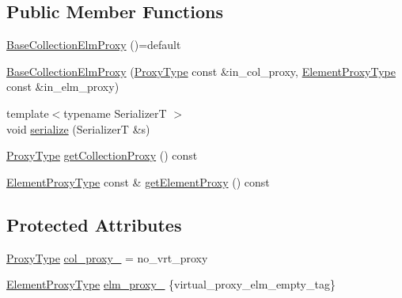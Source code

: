 \subsection*{Public Member Functions}
\begin{DoxyCompactItemize}
\item 
\hyperlink{structvt_1_1vrt_1_1collection_1_1_base_collection_elm_proxy_a2d69acf294b3c84033654a280a2b03d9}{Base\+Collection\+Elm\+Proxy} ()=default
\item 
\hyperlink{structvt_1_1vrt_1_1collection_1_1_base_collection_elm_proxy_a3b6fc7db3f5e10838e11615570ec067f}{Base\+Collection\+Elm\+Proxy} (\hyperlink{structvt_1_1vrt_1_1collection_1_1_base_collection_elm_proxy_af80f1576659b626a30828c6d85eca926}{Proxy\+Type} const \&in\+\_\+col\+\_\+proxy, \hyperlink{structvt_1_1vrt_1_1collection_1_1_base_collection_elm_proxy_a0f37a49c04c28fdc6ea8665aefc2f40c}{Element\+Proxy\+Type} const \&in\+\_\+elm\+\_\+proxy)
\item 
{\footnotesize template$<$typename SerializerT $>$ }\\void \hyperlink{structvt_1_1vrt_1_1collection_1_1_base_collection_elm_proxy_ac49c4e9d158a3d3c874f1dcfb5a8505c}{serialize} (SerializerT \&s)
\item 
\hyperlink{structvt_1_1vrt_1_1collection_1_1_base_collection_elm_proxy_af80f1576659b626a30828c6d85eca926}{Proxy\+Type} \hyperlink{structvt_1_1vrt_1_1collection_1_1_base_collection_elm_proxy_ae2b8c7f266600f1c68c2036f6be2a463}{get\+Collection\+Proxy} () const
\item 
\hyperlink{structvt_1_1vrt_1_1collection_1_1_base_collection_elm_proxy_a0f37a49c04c28fdc6ea8665aefc2f40c}{Element\+Proxy\+Type} const  \& \hyperlink{structvt_1_1vrt_1_1collection_1_1_base_collection_elm_proxy_a1c9b3e1ffc06c20783a1bfcc09e70d53}{get\+Element\+Proxy} () const
\end{DoxyCompactItemize}
\subsection*{Protected Attributes}
\begin{DoxyCompactItemize}
\item 
\hyperlink{structvt_1_1vrt_1_1collection_1_1_base_collection_elm_proxy_af80f1576659b626a30828c6d85eca926}{Proxy\+Type} \hyperlink{structvt_1_1vrt_1_1collection_1_1_base_collection_elm_proxy_a6613b91da1dbba1f1aa220ac684dfe84}{col\+\_\+proxy\+\_\+} = no\+\_\+vrt\+\_\+proxy
\item 
\hyperlink{structvt_1_1vrt_1_1collection_1_1_base_collection_elm_proxy_a0f37a49c04c28fdc6ea8665aefc2f40c}{Element\+Proxy\+Type} \hyperlink{structvt_1_1vrt_1_1collection_1_1_base_collection_elm_proxy_a2209d932a492ec78d0d086a51ab9460e}{elm\+\_\+proxy\+\_\+} \{virtual\+\_\+proxy\+\_\+elm\+\_\+empty\+\_\+tag\}
\end{DoxyCompactItemize}


